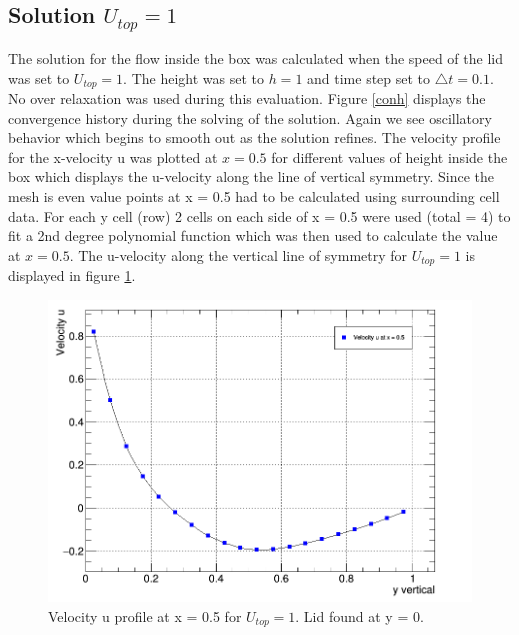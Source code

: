 \documentclass[paper=a4, fontsize=11pt, abstract=on]{scrartcl}
\numberwithin{equation}{section}		%
\numberwithin{figure}{section}			%
\numberwithin{table}{section}				%
\begin{document}
 

\subsection{Solution $U_{top} = 1$}
The solution for the flow inside the box was calculated when the speed of the lid was set to $U_{top} = 1$. The height was set to $h=1$ and time step set to $\triangle t = 0.1$. No over relaxation was used during this evaluation. Figure \ref{conh} displays the convergence history during the solving of the solution. Again we see oscillatory behavior which begins to smooth out as the solution refines. The velocity profile for the x-velocity u was plotted at $x=0.5$ for different values of height inside the box which displays the u-velocity along the line of vertical symmetry. Since the mesh is even value points at x = 0.5 had to be calculated using surrounding cell data.  For each y cell (row) 2 cells on each side of x = 0.5 were used (total = 4) to fit a 2nd degree polynomial function which was then used to calculate the value at $x= 0.5$. The u-velocity along the vertical line of symmetry for $U_{top} = 1$ is displayed in figure \ref{usym1}. 

\begin{figure}[H]
\centering
\includegraphics[width=0.80\linewidth]{con1}
\caption{Velocity u profile at x = 0.5 for $U_{top}=1$. Lid found at y = 0. }
\label{usym1}
\end{figure}
\end{document}
